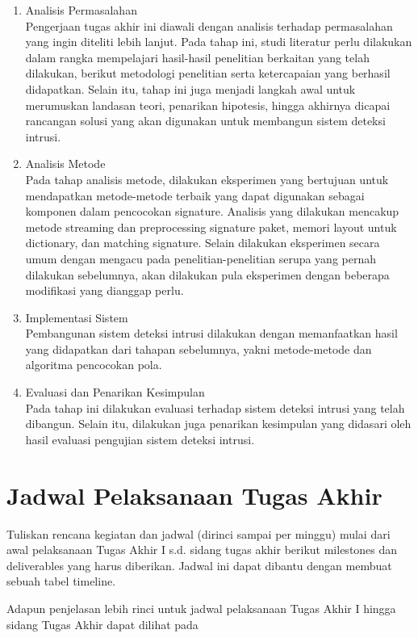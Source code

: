   \begin{enumerate}
      \item Analisis Permasalahan \\
      Pengerjaan tugas akhir ini diawali dengan analisis terhadap permasalahan yang ingin diteliti lebih lanjut. Pada tahap ini, studi literatur perlu dilakukan dalam rangka mempelajari hasil-hasil penelitian berkaitan yang telah dilakukan, berikut metodologi penelitian serta ketercapaian yang berhasil didapatkan. Selain itu, tahap ini juga menjadi langkah awal untuk merumuskan landasan teori, penarikan hipotesis, hingga akhirnya dicapai rancangan solusi yang akan digunakan untuk membangun sistem deteksi intrusi.

      \item Analisis Metode \\
      Pada tahap analisis metode, dilakukan eksperimen yang bertujuan untuk mendapatkan metode-metode terbaik yang dapat digunakan sebagai komponen dalam pencocokan signature. Analisis yang dilakukan mencakup metode streaming dan preprocessing signature paket, memori layout untuk dictionary, dan matching signature. Selain dilakukan eksperimen secara umum dengan mengacu pada penelitian-penelitian serupa yang pernah dilakukan sebelumnya, akan dilakukan pula eksperimen dengan beberapa modifikasi yang dianggap perlu.

      \item Implementasi Sistem \\
      Pembangunan sistem deteksi intrusi dilakukan dengan memanfaatkan hasil yang didapatkan dari tahapan sebelumnya, yakni metode-metode dan algoritma pencocokan pola. 

      \item Evaluasi dan Penarikan Kesimpulan \\
      Pada tahap ini dilakukan evaluasi terhadap sistem deteksi intrusi yang telah dibangun. Selain itu, dilakukan juga penarikan kesimpulan yang didasari oleh hasil evaluasi pengujian sistem deteksi intrusi.

  \end{enumerate}

\section{Jadwal Pelaksanaan Tugas Akhir}

  Tuliskan rencana kegiatan dan jadwal (dirinci sampai per minggu) mulai dari awal pelaksanaan Tugas Akhir I s.d. sidang tugas akhir berikut milestones dan deliverables yang harus diberikan. Jadwal ini dapat dibantu dengan membuat sebuah tabel timeline.

  

  Adapun penjelasan lebih rinci untuk jadwal pelaksanaan Tugas Akhir I hingga sidang Tugas Akhir dapat dilihat pada 

  
